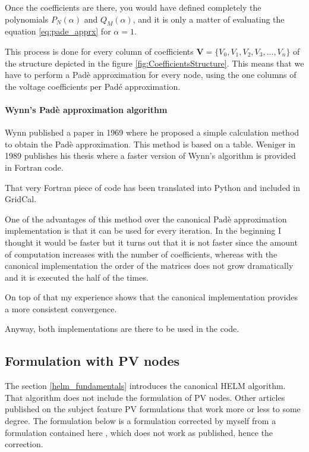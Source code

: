 \documentclass[a4paper,twoside,fleqn]{tufte-book}
\begin{document}
Once the coefficients are there, you would have defined completely the polynomials $P_N(\alpha)$ and $Q_M(\alpha)$, and it is only a matter of evaluating the equation \ref{eq:pade_apprx} for $\alpha=1$.\newline


This process is done for every column of coefficients $\textbf{V}=\{V_0, V_1,V_2,V_3, ...,V_n\}$ of the structure depicted in the figure \ref{fig:CoefficientsStructure}. This means that we have to perform a Padè approximation for every node, using the one columns of the voltage coefficients per Padé approximation.

\paragraph{Wynn's Padè approximation algorithm}

Wynn published a paper in 1969 where he proposed a simple calculation method to obtain the Padè approximation. This method is based on a table. Weniger in 1989 publishes his thesis where a faster version of Wynn's algorithm is provided in Fortran code. 

That very Fortran piece of code has been translated into Python and included in GridCal.

One of the advantages of this method over the canonical Padè approximation implementation is that it can be used for every iteration. In the beginning I thought it would be faster but it turns out that it is not faster since the amount of computation increases with the number of coefficients, whereas with the canonical implementation the order of the matrices does not grow dramatically and it is executed the half of the times.

On top of that my experience shows that the canonical implementation provides a more consistent convergence.

Anyway, both implementations are there to be used in the code.




\subsection{Formulation with PV nodes}

The section \ref{helm_fundamentals} introduces the canonical HELM algorithm. That algorithm does not include the formulation of PV nodes.
Other articles published on the subject feature PV formulations that work more or less to some degree. The formulation below is a formulation corrected by myself from a formulation contained here \cite{liu2017online}, which does not work as published, hence the correction.
\end{document}
